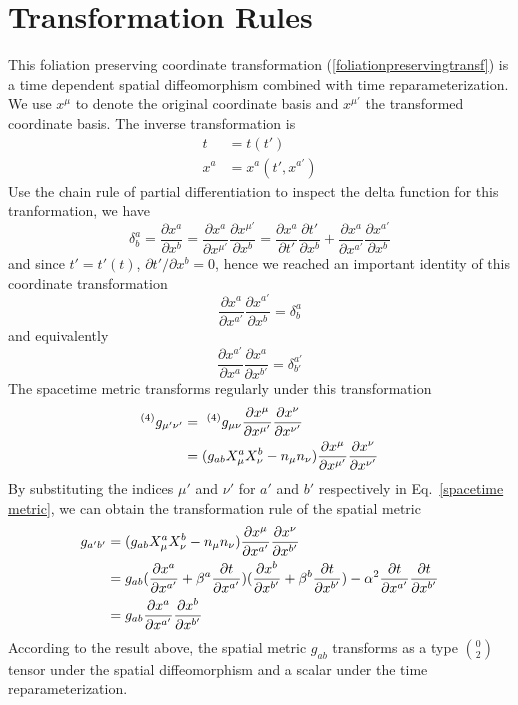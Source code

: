 \documentclass[letterpaper,nofootinbib,prd,amsmath,onecolumn]{revtex4-1}
\begin{document}
\section{Transformation Rules}\label{transform}
This foliation preserving coordinate transformation (\ref{foliationpreservingtransf}) is a time dependent spatial diffeomorphism combined with 
time reparameterization. We use $x^{\mu}$ to denote the original coordinate basis and $x^{\mu'}$ the transformed coordinate basis. The inverse transformation is  
\begin{align*}
t & = t(t')\\
x^{a} & = x^{a}(t',x^{a'})
\end{align*}
Use the chain rule of partial differentiation to inspect the delta function for this tranformation, we have
\[
\delta^{a}_{b} = \frac{\partial x^{a}}{\partial x^{b}} = \frac{\partial x^{a}}{\partial x^{\mu'}}\frac{\partial x^{\mu'}}{\partial x^{b}} = \frac{\partial x^{a}}{\partial t'}\frac{\partial t'}{\partial x^{b}} + \frac{\partial x^{a}}{\partial x^{a'}}\frac{\partial x^{a'}}{\partial x^{b}}
\]
and since $t' = t'(t)$, $\partial t'/\partial x^{b} = 0$, hence we reached an important identity of this coordinate transformation
\begin{equation}
\frac{\partial x^{a}}{\partial x^{a'}}\frac{\partial x^{a'}}{\partial x^{b}} = \delta^{a}_{b}
\end{equation}
and equivalently
\begin{equation}
\frac{\partial x^{a'}}{\partial x^{a}}\frac{\partial x^{a}}{\partial x^{b'}} = \delta^{a'}_{b'}
\end{equation}
The spacetime metric transforms regularly under this transformation
\begin{align}\label{spacetime metric}
^{(4)}g_{\mu'\nu'} &=~^{(4)}g_{\mu\nu}\frac{\partial x^{\mu}}{\partial x^{\mu'}}\frac{\partial x^{\nu}}{\partial x^{\nu'}}\notag\\
& = (g_{ab}X^{a}_{\mu}X^{b}_{\nu} - n_{\mu}n_{\nu})\frac{\partial x^{\mu}}{\partial x^{\mu'}}\frac{\partial x^{\nu}}{\partial x^{\nu'}}
\end{align}
By substituting the indices $\mu'$ and $\nu'$ for $a'$ and $b'$ respectively in Eq.~\ref{spacetime metric}, we can obtain the transformation rule of the spatial metric
\begin{align}
g_{a'b'} & = (g_{ab}X^{a}_{\mu}X^{b}_{\nu} - n_{\mu}n_{\nu})\frac{\partial x^{\mu}}{\partial x^{a'}}\frac{\partial x^{\nu}}{\partial x^{b'}}\notag\\
&= g_{ab}(\frac{\partial x^{a}}{\partial x^{a'}} + \beta^{a}\frac{\partial t}{\partial x^{a'}})(\frac{\partial x^{b}}{\partial x^{b'}} + \beta^{b}\frac{\partial t}{\partial x^{b'}}) - \alpha^2\frac{\partial t}{\partial x^{a'}}\frac{\partial t}{\partial x^{b'}}\notag\\
& = g_{ab}\frac{\partial x^{a}}{\partial x^{a'}}\frac{\partial x^{b}}{\partial x^{b'}}
\end{align}
According to the result above, the spatial metric $g_{ab}$ transforms as a type $0 \choose 2$ tensor under the spatial diffeomorphism and a scalar under the time reparameterization.
\end{document}
